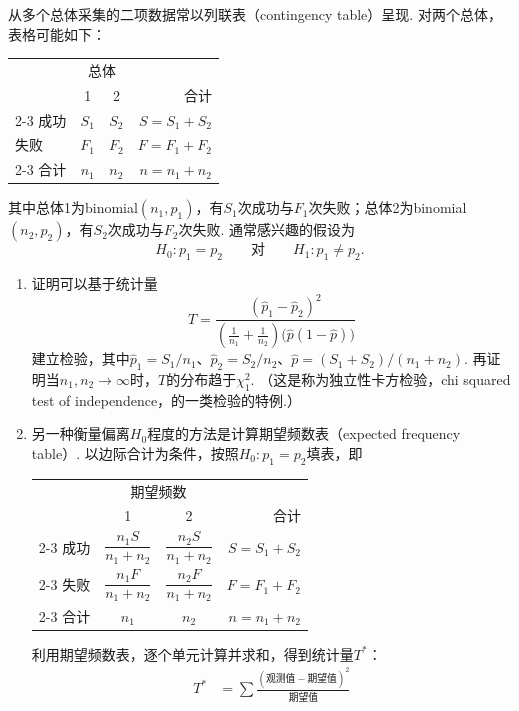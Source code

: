 \begin{exercise}\label{exercise:10.31}
从多个总体采集的二项数据常以列联表（contingency table）呈现. 对两个总体，表格可能如下：
\begin{center}
\begin{tabular}{lccr}
&\multicolumn{2}{c}{总体}&\\
&1&2&合计\\\cline{2-3}
成功&\multicolumn{1}{|c|}{$S_1$}&\multicolumn{1}{c|}{$S_2$}&$S=S_1+S_2$\\
失败&\multicolumn{1}{|c|}{$F_1$}&\multicolumn{1}{c|}{$F_2$}&$F=F_1+F_2$\\\cline{2-3}
合计&$n_1$&$n_2$&$n=n_1+n_2$
\end{tabular}
\end{center}
其中总体1为binomial$(n_1,p_1)$，有$S_1$次成功与$F_1$次失败；总体2为binomial$(n_2,p_2)$，有$S_2$次成功与$F_2$次失败. 通常感兴趣的假设为
$$H_0:p_1=p_2\qquad\text{对}\qquad H_1:p_1\ne p_2.$$
\begin{enumerate}[label=(\alph*)]
\item\label{item:10.31.a} 证明可以基于统计量
$$T=\frac{(\hat p_1-\hat p_2)^2}{\left(\frac1{n_1}+\frac1{n_2}\right)\bigl(\hat p(1-\hat p)\bigr)}$$
建立检验，其中$\hat p_1=S_1/n_1$、$\hat p_2=S_2/n_2$、$\hat p=(S_1+S_2)/(n_1+n_2)$. 再证明当$n_1,n_2\to\infty$时，$T$的分布趋于$\chi_1^2$. （这是称为独立性卡方检验，chi squared test of independence，的一类检验的特例.）
\item 另一种衡量偏离$H_0$程度的方法是计算期望频数表（expected frequency table）. 以边际合计为条件，按照$H_0:p_1=p_2$填表，即
\begin{center}
\renewcommand{\arraystretch}{1.7}
\begin{tabular}{lccr}
&\multicolumn{2}{c}{期望频数}&\\
&1&2&合计\\\cline{2-3}
成功&\multicolumn{1}{|c|}{$\dfrac{n_1S}{n_1+n_2}$}&\multicolumn{1}{c|}{$\dfrac{n_2S}{n_1+n_2}$}&$S=S_1+S_2$\\\cline{2-3}
失败&\multicolumn{1}{|c|}{$\dfrac{n_1F}{n_1+n_2}$}&\multicolumn{1}{c|}{$\dfrac{n_2F}{n_1+n_2}$}&$F=F_1+F_2$\\\cline{2-3}
合计&$n_1$&$n_2$&$n=n_1+n_2$
\end{tabular}
\end{center}
利用期望频数表，逐个单元计算并求和，得到统计量$T^*$：
$$\begin{aligned}
T^*&=\sum\frac{(\text{观测值}-\text{期望值})^2}{\text{期望值}}\\

\end{aligned}$$
\end{enumerate}
\end{exercise}
